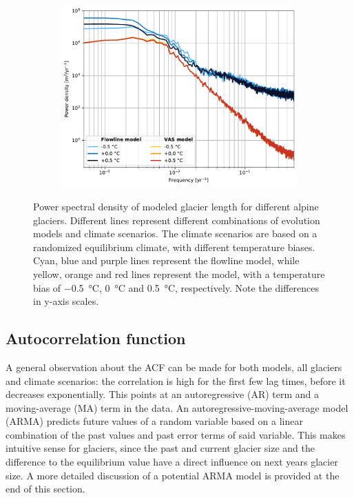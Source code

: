 \begin{figure}[htp]
\begin{subfigure}[b]{0.48\textwidth}
          \includegraphics[width=\textwidth]{../plots/final_plots/psd/Rhonegletscher.pdf}
        \end{subfigure}

        \caption{Power spectral density of modeled glacier length for different alpine glaciers. Different lines represent different combinations of evolution models and climate scenarios. The climate scenarios are based on a randomized equilibrium climate, with different temperature biases. Cyan, blue and purple lines represent the flowline model, while yellow, orange and red lines represent the \vas{} model, with a temperature bias of \SI{-.5}{\celsius}, \SI{0}{\celsius} and \SI{+.5}{\celsius}, respectively. Note the differences in y-axis scales.}
        \label{fig:psd}
      \end{figure}
    

    \subsection{Autocorrelation function} %
    \label{sub:autocorrelation_function_results}

      A general observation about the ACF can be made for both models, all glaciers and climate scenarios: the correlation is high for the first few lag times, before it decreases exponentially. This points at an autoregressive (AR) term and a moving-average (MA) term in the data. An autoregressive-moving-average model (ARMA) predicts future values of a random variable based on a linear combination of the past values and past error terms of said variable. This makes intuitive sense for glaciers, since the past and current glacier size and the difference to the equilibrium value have a direct influence on next years glacier size. A more detailed discussion of a potential ARMA model is provided at the end of this section.


